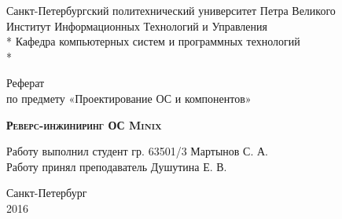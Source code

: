 \begin{titlepage}
\thispagestyle{empty}

\begin{center}
Санкт-Петербургский политехнический университет Петра Великого\\
Институт Информационных Технологий и Управления \\*
Кафедра компьютерных систем и программных технологий \\*
\hrulefill
\end{center}

\vspace{15em}

\begin{center}
\Large Реферат\\по предмету «Проектирование ОС и компонентов» \\
\end{center}

\vspace{1em}

\begin{center}
\textsc{\textbf{Реверс-инжиниринг ОС Minix}}
\end{center}

\vspace{20em}

\begin{flushleft}
Работу выполнил студент гр. 63501/3 \hrulefill Мартынов С. А. \\
\vspace{1.5em}
Работу принял преподаватель \hrulefill Душутина Е. В. \\
\end{flushleft}

\vspace{\fill}

\begin{center}
Санкт-Петербург \\
2016
\end{center}

\end{titlepage}
\setcounter{page}{2}